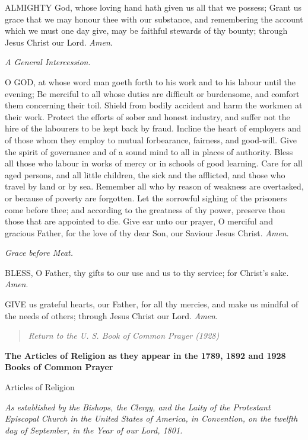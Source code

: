 ALMIGHTY God, whose loving
hand hath given us all that we possess; Grant us grace that we may honour
thee with our substance, and remembering the account which we must one
day give, may be faithful stewards of thy bounty; through Jesus Christ
our Lord. \emph{Amen}.

\emph{A General Intercession.}

O GOD, at whose word man
goeth forth to his work and to his labour until the evening; Be merciful
to all whose duties are difficult or burdensome, and comfort them concerning
their toil. Shield from bodily accident and harm the workmen at their
work. Protect the efforts of sober and honest industry, and suffer not
the hire of the labourers to be kept back by fraud. Incline the heart
of employers and of those whom they employ to mutual forbearance, fairness,
and good-will. Give the spirit of governance and of a sound mind to all
in places of authority. Bless all those who labour in works of mercy or
in schools of good learning. Care for all aged persons, and all little
children, the sick and the afflicted, and those who travel by land or
by sea. Remember all who by reason of weakness are overtasked, or because
of poverty are forgotten. Let the sorrowful sighing of the prisoners come
before thee; and according to the greatness of thy power, preserve thou
those that are appointed to die. Give ear unto our prayer, O merciful
and gracious Father, for the love of thy dear Son, our Saviour Jesus Christ.
\emph{Amen}.

\emph{Grace before Meat.}

BLESS, O Father, thy gifts
to our use and us to thy service; for Christ’s sake. \emph{Amen}.

GIVE us grateful hearts,
our Father, for all thy mercies, and make us mindful of the needs of others;
through Jesus Christ our Lord. \emph{Amen}. 

\begin{quote}

\emph{Return to the U.
S. Book of Common Prayer (1928)}

\end{quote}


\textbf{The Articles of Religion as they appear in the 1789, 1892 and 1928 Books of
Common Prayer}

Articles
of Religion

\emph{As
established by the Bishops, the Clergy, and the Laity of the Protestant
Episcopal Church in the United States of America, in Convention, on the twelfth day of September, in the Year of our Lord, 1801.}


